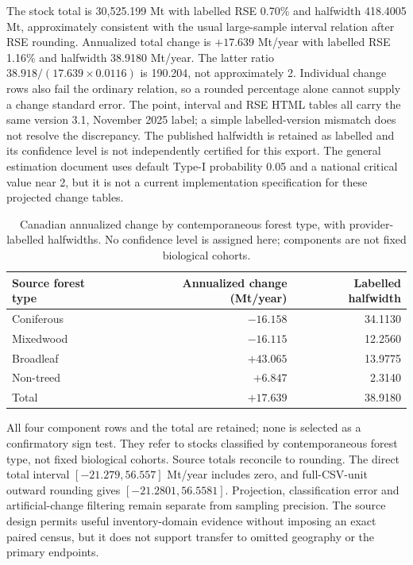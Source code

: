 The stock total is 30,525.199 Mt with labelled RSE 0.70\% and halfwidth 418.4005 Mt, approximately consistent with the usual large-sample interval relation after RSE rounding. Annualized total change is $+17.639$ Mt/year with labelled RSE 1.16\% and halfwidth 38.9180 Mt/year. The latter ratio $38.918/(17.639\times0.0116)$ is 190.204, not approximately 2. Individual change rows also fail the ordinary relation, so a rounded percentage alone cannot supply a change standard error. The point, interval and RSE HTML tables all carry the same version 3.1, November 2025 label; a simple labelled-version mismatch does not resolve the discrepancy. The published halfwidth is retained as labelled and its confidence level is not independently certified for this export. The general estimation document uses default Type-I probability 0.05 and a national critical value near 2, but it is not a current implementation specification for these projected change tables.

\begin{table}[htbp]\centering\small
\caption{Canadian annualized change by contemporaneous forest type, with provider-labelled halfwidths. No confidence level is assigned here; components are not fixed biological cohorts.}\label{tab:SI_Canada_components}
\begin{tabular}{lrr}\toprule
Source forest type & Annualized change (Mt/year) & Labelled halfwidth\\\midrule
Coniferous & $-16.158$ & 34.1130\\
Mixedwood & $-16.115$ & 12.2560\\
Broadleaf & $+43.065$ & 13.9775\\
Non-treed & $+6.847$ & 2.3140\\
Total & $+17.639$ & 38.9180\\\bottomrule
\end{tabular}\end{table}

All four component rows and the total are retained; none is selected as a confirmatory sign test. They refer to stocks classified by contemporaneous forest type, not fixed biological cohorts. Source totals reconcile to rounding. The direct total interval $[-21.279,56.557]$ Mt/year includes zero, and full-CSV-unit outward rounding gives $[-21.2801,56.5581]$. Projection, classification error and artificial-change filtering remain separate from sampling precision. The source design permits useful inventory-domain evidence without imposing an exact paired census, but it does not support transfer to omitted geography or the primary endpoints.

